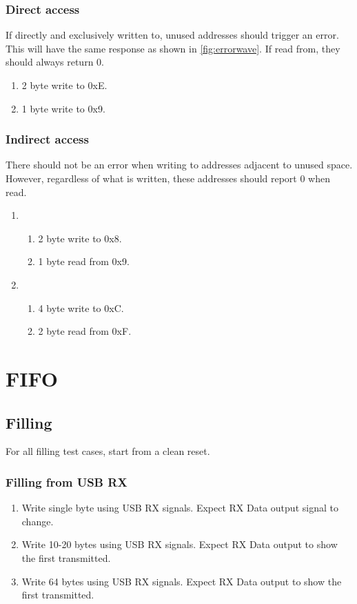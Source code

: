 \documentclass{scrartcl}
\begin{document}
\subsubsection{Direct access}
If directly and exclusively written to, unused addresses should trigger an error. This will have the same response as shown in \autoref{fig:errorwave}. If read from, they should always return 0.

\begin{enumerate}
    \item 2 byte write to 0xE.
    \item 1 byte write to 0x9.
\end{enumerate}

\subsubsection{Indirect access}
There should not be an error when writing to addresses adjacent to unused space. However, regardless of what is written, these addresses should report 0 when read.

\begin{enumerate}
    \item
    \begin{enumerate}
        \item 2 byte write to 0x8.
        \item 1 byte read from 0x9.
    \end{enumerate}
    \item
    \begin{enumerate}
        \item 4 byte write to 0xC.
        \item 2 byte read from 0xF.
    \end{enumerate}
\end{enumerate}

\section{FIFO}

\subsection{Filling}
For all filling test cases, start from a clean reset. 

\subsubsection{Filling from USB RX}
\begin{enumerate}
    \item Write single byte using USB RX signals. Expect RX Data output signal to change.
    \item Write 10-20 bytes using USB RX signals. Expect RX Data output to show the first transmitted.
    \item Write 64 bytes using USB RX signals. Expect RX Data output to show the first transmitted.
\end{enumerate}
\end{document}
